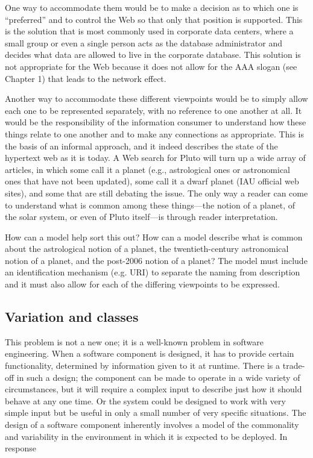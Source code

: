 One way to accommodate them would be to make a decision as to which one
is ``preferred'' and to control the Web so that only that position is
supported. This is the solution that is most commonly used in corporate
data centers, where a small group or even a single person acts as the
database administrator and decides what data are allowed to live in the
corporate database. This solution is not appropriate for the Web because
it does not allow for the AAA slogan (see Chapter 1) that leads to the
network effect.

Another way to accommodate these different viewpoints would be to simply
allow each one to be represented separately, with no reference to one
another at all. It would be the responsibility of the information
consumer to understand how these things relate to one another and to
make any connections as appropriate. This is the basis of an informal
approach, and it indeed describes the state of the hypertext web as it is
today. A Web search for Pluto will turn up a wide array of articles, in
which some call it a planet (e.g., astrological ones or astronomical
ones that have not been updated), some call it a dwarf planet (IAU
official web sites), and some that are still debating the issue. The
only way a reader can come to understand what is common among these
things---the notion of a planet, of the solar system, or even of Pluto
itself---is through reader interpretation.

How can a model help sort this out? How can a model describe what is
common about the astrological notion of a planet, the twentieth-century
astronomical notion of a planet, and the post-2006 notion of a planet?
The model must include an identification mechanism (e.g. URI) to
separate the naming from description and it must also allow for each of
the differing viewpoints to be expressed.

\subsection{Variation and classes}

This problem is not a new one; it is a well-known problem in software
engineering. When a software component is designed, it has to provide
certain functionality, determined by information given to it at runtime.
There is a trade-off in such a design; the component can be made to
operate in a wide variety of circumstances, but it will require a
complex input to describe just how it should behave at any one time. Or
the system could be designed to work with very simple input but be
useful in only a small number of very specific situations. The design of
a software component inherently involves a model of the commonality and
variability in the environment in which it is expected to be deployed.
In response

